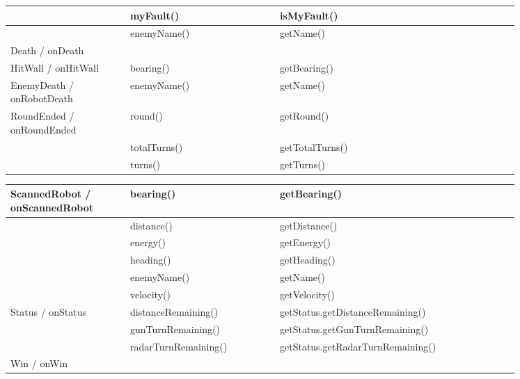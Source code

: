 \begin{center}
\begin{tabular}{ | p{0.2\linewidth} | p{0.25\linewidth} | p{0.4\linewidth} |}
		& myFault() & isMyFault() \\ \hline
		& enemyName() & getName() \\ \hline
		Death / onDeath & & \\ \hline
		HitWall / onHitWall & bearing() & getBearing() \\ \hline
		EnemyDeath / onRobotDeath & enemyName() & getName() \\ \hline
		RoundEnded / onRoundEnded & round() & getRound() \\ \hline
		& totalTurns() & getTotalTurns() \\ \hline
		& turns() & getTurns() \\ \hline
	\end{tabular}
\end{center}		
\begin{center}
	\begin{tabular}{ | p{0.2\linewidth} | p{0.25\linewidth} | p{0.4\linewidth} |}
		\hline		
		ScannedRobot / onScannedRobot & bearing() & getBearing() \\ \hline
		& distance() & getDistance() \\ \hline
		& energy() & getEnergy() \\ \hline
		& heading() & getHeading() \\ \hline
		& enemyName() & getName() \\ \hline
		& velocity() & getVelocity() \\ \hline
		Status / onStatus & distanceRemaining() & getStatus.getDistanceRemaining() \\ \hline
		& gunTurnRemaining() & getStatus.getGunTurnRemaining() \\ \hline
		& radarTurnRemaining() & getStatus.getRadarTurnRemaining() \\ \hline
		Win / onWin &  & \\
		\hline
	\end{tabular}
\end{center}